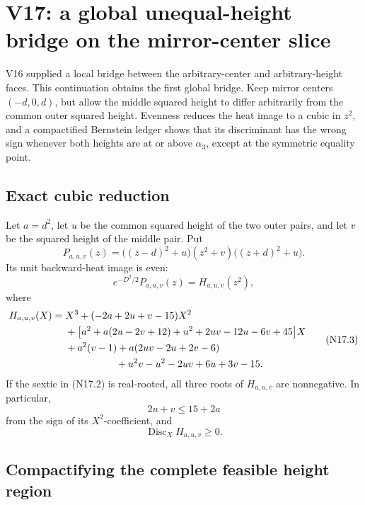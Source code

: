 \documentclass[11pt]{article}
\theoremstyle{definition}
\theoremstyle{remark}
\begin{document}



\section{V17: a global unequal-height bridge on the mirror-center slice}

V16 supplied a local bridge between the arbitrary-center and
arbitrary-height faces.  This continuation obtains the first global bridge.
Keep mirror centers \((-d,0,d)\), but allow the middle squared height to
differ arbitrarily from the common outer squared height.  Evenness reduces
the heat image to a cubic in \(z^2\), and a compactified Bernstein ledger
shows that its discriminant has the wrong sign whenever both heights are at
or above \(\alpha_3\), except at the symmetric equality point.

\subsection{Exact cubic reduction}

Let \(a=d^2\), let \(u\) be the common squared height of the two outer
pairs, and let \(v\) be the squared height of the middle pair.  Put
\[
 P_{a,u,v}(z)
 =\bigl((z-d)^2+u\bigr)(z^2+v)
  \bigl((z+d)^2+u\bigr).
 \tag{N17.1}
\]
Its unit backward-heat image is even:
\[
 e^{-D^2/2}P_{a,u,v}(z)=H_{a,u,v}(z^2),
 \tag{N17.2}
\]
where
\[
\begin{aligned}
 H_{a,u,v}(X)={}&X^3+(-2a+2u+v-15)X^2\\
 &+\bigl[a^2+a(2u-2v+12)+u^2+2uv-12u-6v+45\bigr]X\\
 &+a^2(v-1)+a(2uv-2u+2v-6)\\
 &\hspace{18mm}+u^2v-u^2-2uv+6u+3v-15.
\end{aligned}
\tag{N17.3}
\]
If the sextic in \textup{(N17.2)} is real-rooted, all three roots of
\(H_{a,u,v}\) are nonnegative.  In particular,
\[
 2u+v\leq15+2a
 \tag{N17.4}
\]
from the sign of its \(X^2\)-coefficient, and
\[
 \operatorname{Disc}_XH_{a,u,v}\geq0.
 \tag{N17.5}
\]

\subsection{Compactifying the complete feasible height region}
\end{document}
